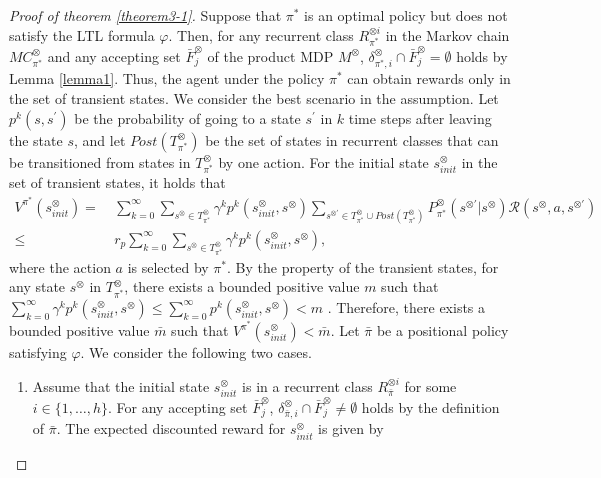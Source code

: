\documentclass[a4j,12pt,oneside,openany,english,dvipdfmx]{jsbook}
\begin{document}
\begin{proof}[Proof of theorem \ref{theorem3-1}]
  Suppose that $\pi^{\ast}$ is an optimal policy but does not satisfy the LTL formula $\varphi$. Then, for any recurrent class $R^{\otimes i}_{{\pi}^{\ast}}$ in the Markov chain $MC^{\otimes}_{{\pi}^{\ast}}$ and any accepting set $\bar{F}^{\otimes}_j$ of the product MDP $M^{\otimes}$,  $\delta^{\otimes}_{\pi^{\ast},i} \cap \bar{F}^{\otimes}_j = \emptyset$
  holds by Lemma \ref{lemma1}. Thus, the agent under the policy $\pi^{\ast}$ can obtain rewards only in the set of transient states. We consider the best scenario in the assumption. Let $p^k(s,s^{\prime})$ be the probability of going to a state $s^{\prime}$ in $k$ time steps after leaving the state $s$, and let $Post(T^{\otimes}_{\pi^{\ast}})$ be the set of states in recurrent classes that can be transitioned from states in $T^{\otimes}_{\pi^{\ast}}$ by one action. For the initial state $s^{\otimes}_{init}$ in the set of transient states, it holds that
  \begin{align}
    V^{\pi^{\ast}}\!(s^{\otimes}_{init})
     =\ & \sum_{k=0}^{\infty} \sum_{s^{\otimes} \in T^{\otimes}_{\pi^{\ast}}} \gamma^k p^k(s^{\otimes}_{init}, s^{\otimes}) \sum_{s^{\otimes \prime} \in T^{\otimes}_{\pi^{\ast}} \cup Post(T^{\otimes}_{\pi^{\ast}})} \!\!\!\!P^{\otimes}_{\pi^{\ast}}(s^{\otimes \prime}| s^{\otimes}) \mathcal{R}(s^{\otimes}, a, s^{\otimes \prime})\nonumber \\
     \leq\ & r_p \sum_{k=0}^{\infty} \sum_{s^{\otimes} \in T^{\otimes}_{\pi^{\ast}}} \gamma^k p^k(s^{\otimes}_{init}, s^{\otimes}), \nonumber
  \label{eqth11}
  \end{align}
  where the action $a$ is selected by $\pi^{\ast}$. By the property of the transient states, for any state $s^{\otimes}$ in $T^{\otimes}_{\pi^{\ast}}$, there exists a bounded positive value $m$ such that $ \sum_{k=0}^{\infty} \gamma^k p^k(s^{\otimes}_{init}, s^{\otimes}) \leq \sum_{k=0}^{\infty} p^k(s^{\otimes}_{init}, s^{\otimes}) < m$ \cite{ESS}. Therefore, there exists a bounded positive value $\bar{m}$ such that $V^{\pi^{\ast}}(s^{\otimes}_{init}) < \bar{m}$.
  Let $\bar{\pi}$ be a positional policy satisfying $\varphi$. We consider the following two cases.
  \begin{enumerate}
    \vspace{2mm}
    \item Assume that the initial state $s^{\otimes}_{init}$ is in a recurrent class $R^{\otimes i}_{\bar{\pi}}$ for some $ i \in \{1,\ldots,h\} $.
    For any accepting set $\bar{F}^{\otimes}_j$, $\delta^{\otimes}_{\bar{\pi},i} \cap \bar{F}^{\otimes}_j \neq \emptyset$ holds by the definition of $\bar{\pi}$. The expected discounted reward for $s^{\otimes}_{init}$ is given by

\end{enumerate}
\end{proof}
\end{document}
